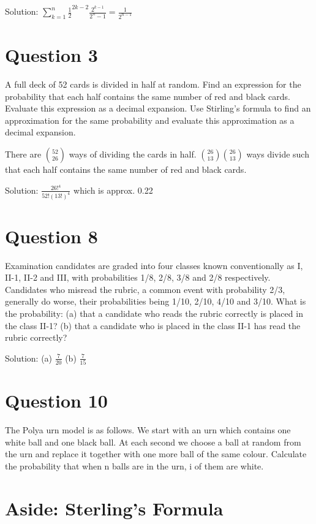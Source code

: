 \documentclass{article}
\begin{document}
Solution: $\sum_{k=1}^{n} \frac{1}{2}^{2k-2}\frac{2^{k-1}}{2^n - 1} = \frac{1}{2^{n - 1}}$


\section{Question 3}

A full deck of 52 cards is divided in half at random. Find an expression for the probability that each half contains the same number of red and black cards. Evaluate this expression as a decimal expansion. Use Stirling’s formula to find an approximation for the same probability and evaluate this approximation as a decimal expansion.

There are $ { 52 \choose 26 } $ ways of dividing the cards in half. $ { 26 \choose 13 }{ 26 \choose 13 } $ ways divide such that each half contains the same number of red and black cards. 

Solution: $ \frac{26!^4}{52!(13!)^4}$ which is approx. 0.22

\section{Question 8}

Examination candidates are graded into four classes known conventionally as I, II-1, II-2 and III,
with probabilities 1/8, 2/8, 3/8 and 2/8 respectively. Candidates who misread the rubric, a common
event with probability 2/3, generally do worse, their probabilities being 1/10, 2/10, 4/10 and 3/10.
What is the probability:
(a) that a candidate who reads the rubric correctly is placed in the class II-1?
(b) that a candidate who is placed in the class II-1 has read the rubric correctly?

Solution: (a) $ \frac{ 7}{ 20 } $ (b) $ \frac{ 7}{ 15 } $ 
\section{Question 10}

The Polya urn model is as follows. We start with an urn which contains one white ball and one black ball. At each second we choose a ball at random from the urn and replace it together with one more ball of the same colour. Calculate the probability that when n balls are in the urn, i of them are white.




\section{Aside: Sterling's Formula}
\end{document}
